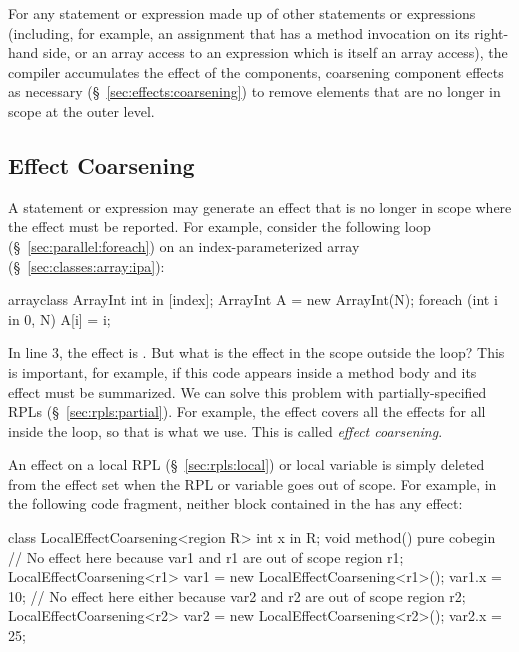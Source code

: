  For any statement or
expression made up of other statements or expressions (including, for
example, an assignment that has a method invocation on its right-hand
side, or an array access to an expression which is itself an array
access), the compiler accumulates the effect of the components,
coarsening component effects as necessary
(\S~\ref{sec:effects:coarsening}) to remove elements that are no
longer in scope at the outer level.



\subsection{Effect Coarsening%
\label{sec:effects:coarsening}}

A statement or expression may generate an effect that is no longer in
scope where the effect must be reported.  For example, consider the
following  loop (\S~\ref{sec:parallel:foreach}) on an
index-parameterized array (\S~\ref{sec:classes:array:ipa}):
%
\begin{numbereddpjlisting}
arrayclass ArrayInt { int in [index]; }
ArrayInt A = new ArrayInt(N);
foreach (int i in 0, N) {
  A[i] = i;
}
\end{numbereddpjlisting}
%
In line 3, the effect is .  But what is the effect in
the scope outside the loop?  This is important, for example, if this
code appears inside a method body and its effect must be summarized.
We can solve this problem with partially-specified RPLs
(\S~\ref{sec:rpls:partial}).  For example, the effect 
covers all the effects  for all  inside the
loop, so that is what we use.  This is called \emph{effect
  coarsening}.

 An effect on a local RPL
(\S~\ref{sec:rpls:local}) or local variable is simply deleted from the
effect set when the RPL or variable goes out of scope.  For example,
in the following code fragment, neither block contained in the
 has any effect:
%
\begin{dpjlisting}
class LocalEffectCoarsening<region R> {
  int x in R;
  void method() 
    pure 
  {
    cobegin {
      // No effect here because var1 and r1 are out of scope
      {
        region r1;
        LocalEffectCoarsening<r1> var1 = 
          new LocalEffectCoarsening<r1>();
        var1.x = 10;
      }
      // No effect here either because var2 and r2 are out of scope
      {
        region r2;
        LocalEffectCoarsening<r2> var2 =
          new LocalEffectCoarsening<r2>();
        var2.x = 25;
      }
    }
  }    
}
\end{dpjlisting}

